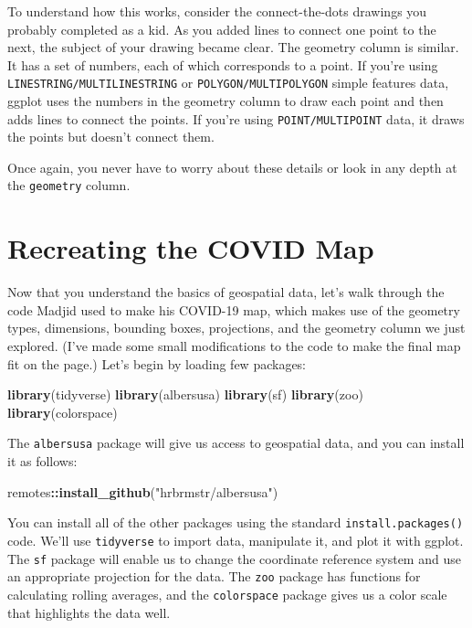 \documentclass[
]{book}
\newenvironment{Shaded}{\begin{snugshade}}{\end{snugshade}}
\newcommand{\FunctionTok}[1]{\textcolor[rgb]{0.13,0.29,0.53}{\textbf{#1}}}
\newcommand{\NormalTok}[1]{#1}
\newcommand{\SpecialCharTok}[1]{\textcolor[rgb]{0.81,0.36,0.00}{\textbf{#1}}}
\newcommand{\StringTok}[1]{\textcolor[rgb]{0.31,0.60,0.02}{#1}}
\begin{document}
To understand how this works, consider the connect-the-dots drawings you probably completed as a kid. As you added lines to connect one point to the next, the subject of your drawing became clear. The geometry column is similar. It has a set of numbers, each of which corresponds to a point. If you're using \texttt{LINESTRING/MULTILINESTRING} or \texttt{POLYGON/MULTIPOLYGON} simple features data, ggplot uses the numbers in the geometry column to draw each point and then adds lines to connect the points. If you're using \texttt{POINT/MULTIPOINT} data, it draws the points but doesn't connect them.

Once again, you never have to worry about these details or look in any depth at the \texttt{geometry} column.

\hypertarget{recreating-the-covid-map}{%
\section*{Recreating the COVID Map}\label{recreating-the-covid-map}}

Now that you understand the basics of geospatial data, let's walk through the code Madjid used to make his COVID-19 map, which makes use of the geometry types, dimensions, bounding boxes, projections, and the geometry column we just explored. (I've made some small modifications to the code to make the final map fit on the page.) Let's begin by loading few packages:

\begin{Shaded}
\begin{Highlighting}[]
\FunctionTok{library}\NormalTok{(tidyverse)}
\FunctionTok{library}\NormalTok{(albersusa)}
\FunctionTok{library}\NormalTok{(sf)}
\FunctionTok{library}\NormalTok{(zoo)}
\FunctionTok{library}\NormalTok{(colorspace)}
\end{Highlighting}
\end{Shaded}

The \texttt{albersusa} package will give us access to geospatial data, and you can install it as follows:

\begin{Shaded}
\begin{Highlighting}[]
\NormalTok{remotes}\SpecialCharTok{::}\FunctionTok{install\_github}\NormalTok{(}\StringTok{"hrbrmstr/albersusa"}\NormalTok{)}
\end{Highlighting}
\end{Shaded}

You can install all of the other packages using the standard \texttt{install.packages()} code. We'll use \texttt{tidyverse} to import data, manipulate it, and plot it with ggplot. The \texttt{sf} package will enable us to change the coordinate reference system and use an appropriate projection for the data. The \texttt{zoo} package has functions for calculating rolling averages, and the \texttt{colorspace} package gives us a color scale that highlights the data well.
\end{document}
